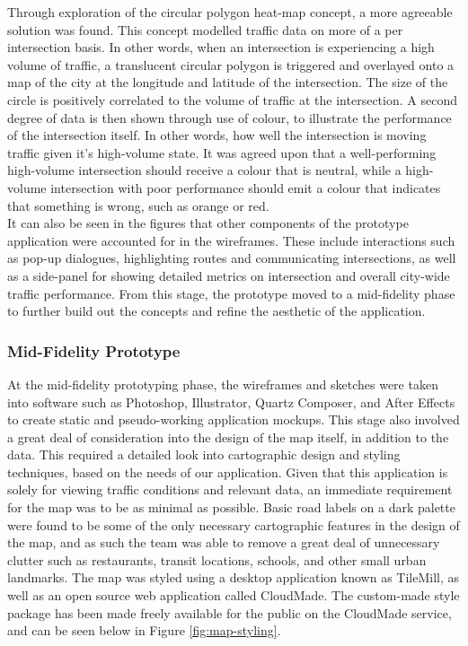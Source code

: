 \documentclass{article}
\begin{document}
Through exploration of the circular polygon heat-map concept, a more agreeable solution was found.
This concept modelled traffic data on more of a per intersection basis.
In other words, when an intersection is experiencing a high volume of traffic, a translucent circular polygon is triggered and overlayed onto a map of the city at the longitude and latitude of the intersection.
The size of the circle is positively correlated to the volume of traffic at the intersection.
A second degree of data is then shown through use of colour, to illustrate the performance of the intersection itself.
In other words, how well the intersection is moving traffic given it's high-volume state.
It was agreed upon that a well-performing high-volume intersection should receive a colour that is neutral, while a high-volume intersection with poor performance should emit a colour that indicates that something is wrong, such as orange or red.\\

It can also be seen in the figures that other components of the prototype application were accounted for in the wireframes.
These include interactions such as pop-up dialogues, highlighting routes and communicating intersections, as well as a side-panel for showing detailed metrics on intersection and overall city-wide traffic performance.
From this stage, the prototype moved to a mid-fidelity phase to further build out the concepts and refine the aesthetic of the application.\\

\subsubsection{Mid-Fidelity Prototype}

At the mid-fidelity prototyping phase, the wireframes and sketches were taken into software such as Photoshop, Illustrator, Quartz Composer, and After Effects to create static and pseudo-working application mockups.
This stage also involved a great deal of consideration into the design of the map itself, in addition to the data.
This required a detailed look into cartographic design and styling techniques, based on the needs of our application.
Given that this application is solely for viewing traffic conditions and relevant data, an immediate requirement for the map was to be as minimal as possible.
Basic road labels on a dark palette were found to be some of the only necessary cartographic features in the design of the map, and as such the team was able to remove a great deal of unnecessary clutter such as restaurants, transit locations, schools, and other small urban landmarks.
The map was styled using a desktop application known as TileMill, as well as an open source web application called CloudMade.
The custom-made style package has been made freely available for the public on the CloudMade service, and can be seen below in Figure \ref{fig:map-styling}.\\
\end{document}
